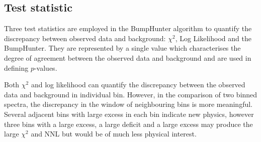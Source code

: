 \subsection{Test statistic}
Three test statistics are employed in the BumpHunter algorithm to quantify the discrepancy between observed data and background: $\chi^{2}$, Log Likelihood and the BumpHunter. They are represented by a single value which characterises the degree of agreement between the observed data and background and are used in defining $p$-values.



Both $\chi^{2}$ and log likelihood can quantify the discrepancy between the observed data and background in individual bin.
However, in the comparison of two binned spectra, the discrepancy in the window of neighbouring bins is more meaningful.
Several adjacent bins with large excess in each bin indicate new physics, however three bins with a large excess, a large deficit and a large excess may produce the large $\chi^{2}$ and NNL but would be of much less physical interest.

